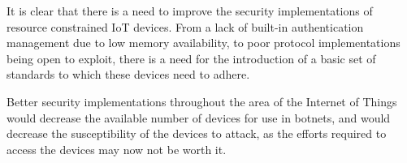 It is clear that there is a need to improve the security implementations of
resource constrained IoT devices. From a lack of built-in authentication
management due to low memory availability, to poor protocol implementations
being open to exploit, there is a need for the introduction of a basic set of
standards to which these devices need to adhere.

Better security implementations throughout the area of the Internet of Things
would decrease the available number of devices for use in botnets, and would
decrease the susceptibility of the devices to attack, as the efforts required to
access the devices may now not be worth it.
